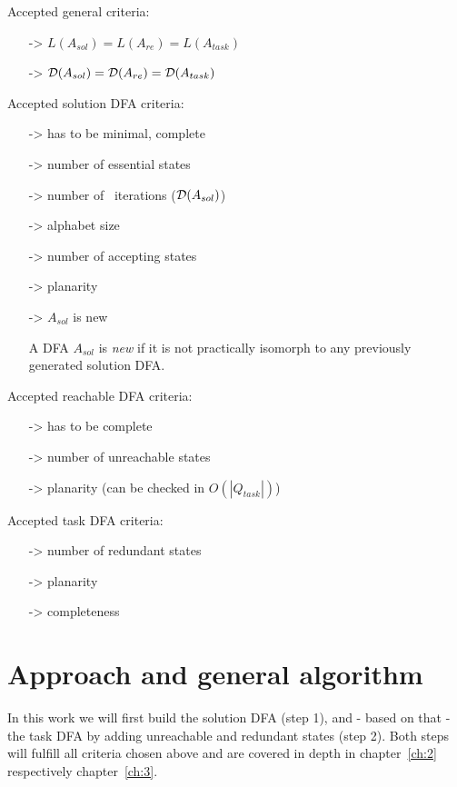 \label{ch:1:determined-requirements}
Accepted general criteria:
\begin{itemize}
	\item[->] $L(A_{sol}) = L(A_{re}) = L(A_{task})$
	\item[->] $\mathcal{D}(A_{sol}) = \mathcal{D}(A_{re}) = \mathcal{D}(A_{task})$
\end{itemize}
Accepted solution DFA criteria:
\begin{itemize}
	\item[->] has to be minimal, complete
	\item[->] number of essential states
	\item[->] number of \CompDist\ iterations ($\mathcal{D}(A_{sol})$)
	\item[->] alphabet size
	\item[->] number of accepting states
	\item[->] planarity
	\item[->] $A_{sol}$ is new
	
	\begin{definition} \label{ch:1:new-dfa}
		A DFA $A_{sol}$ is \emph{new} if it is not practically isomorph to any previously generated solution DFA.
	\end{definition}
\end{itemize}
Accepted reachable DFA criteria:
\begin{itemize}
	\item[->] has to be complete
	\item[->] number of unreachable states
	\item[->] planarity (can be checked in $O(|Q_{task}|)$)
\end{itemize}
Accepted task DFA criteria:
\begin{itemize}
	\item[->] number of redundant states
	\item[->] planarity
	\item[->] completeness
\end{itemize}

\section{Approach and general algorithm}

In this work we will first build the solution DFA (step 1), and - based on that - the task DFA by adding unreachable and redundant states (step 2). Both steps will fulfill all criteria chosen above and are covered in depth in chapter~\ref{ch:2} respectively chapter~\ref{ch:3}.

